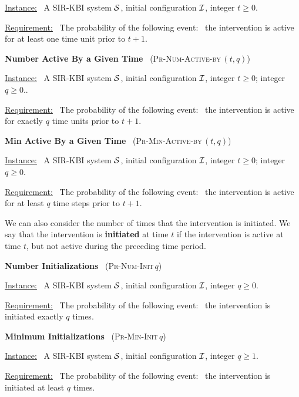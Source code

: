\documentclass[11pt]{article}
\newcommand{\cali}{\mbox{${\cal I}$}}
\newcommand{\cals}{\mbox{${\cal S}$}}
\newcommand{\NumInits}{\mbox{\textsc{Pr-Num-Init}$\,q$}}
\newcommand{\MinInits}{\mbox{\textsc{Pr-Min-Init}$\,q$}}
\newcommand{\NumActiveBy}{\mbox{\textsc{Pr-Num-Active-by}$\,(t,q)$}}
\newcommand{\MinActiveBy}{\mbox{\textsc{Pr-Min-Active-by}$\,(t,q)$}}
\begin{document}
\medskip
\noindent
\underline{Instance:}~ A SIR-KBI system \cals,
initial configuration \cali, integer $t \geq 0$.

\smallskip
\noindent
\underline{Requirement:}~ The probability of the following
event:~ the intervention is active for at least one time unit prior to $t+1$.

\bigskip

\noindent
\textbf{Number Active By a Given Time}~ (\NumActiveBy)

\medskip
\noindent
\underline{Instance:}~ A SIR-KBI system \cals,
initial configuration \cali, integer $t \geq 0$; integer $q \geq 0$..

\smallskip
\noindent
\underline{Requirement:}~ The probability of the following
event:~ the intervention is active for exactly $q$ time units prior to $t+1$.


\bigskip

\noindent
\textbf{Min Active By a Given Time}~ (\MinActiveBy)

\medskip
\noindent
\underline{Instance:}~ A SIR-KBI system \cals,
initial configuration \cali, integer $t \geq 0$; integer $q \geq 0$.

\smallskip
\noindent
\underline{Requirement:}~ The probability of the following
event:~ the intervention is active for at least $q$ time steps prior to $t+1$.


\bigskip

We can also consider the number of times that the intervention is initiated.
We say that the intervention is {\bf initiated} at time $t$ if the intervention is active at time $t$,
but not active during the preceding time period.

\bigskip
\noindent
\textbf{Number Initializations}~ (\NumInits)

\medskip
\noindent
\underline{Instance:}~ A SIR-KBI system \cals,
initial configuration \cali, integer $q \geq 0$.

\smallskip
\noindent
\underline{Requirement:}~ The probability of the following
event:~ the intervention is initiated exactly $q$ times.


\bigskip
\noindent
\textbf{Minimum Initializations}~ (\MinInits)

\medskip
\noindent
\underline{Instance:}~ A SIR-KBI system \cals,
initial configuration \cali, integer $q \geq 1$.

\smallskip
\noindent
\underline{Requirement:}~ The probability of the following
event:~ the intervention is initiated at least $q$ times.
\end{document}
